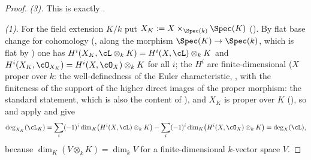 \begin{proof}
\emph{(3).}  This is exactly .

\emph{(1).}  For the field extension $K/k$ put $X_K:=X\times_{\Spec(k)}\Spec(K)$ ().
By flat base change for cohomology (,
along the morphism $\Spec(K)\to\Spec(k)$, which is flat by
) one has
$H^i(X_K,\cL\otimes_kK)=H^i(X,\cL)\otimes_kK$ and
$H^i(X_K,\cO_{X_K})=H^i(X,\cO_X)\otimes_kK$ for all $i$; the $H^i$ are
finite-dimensional ($X$ proper over $k$: the well-definedness of the
Euler characteristic, ,
with the finiteness of the support of the higher direct images of the
proper morphism: the standard statement, which is also the content of
), and $X_K$ is proper over $K$
(), so
 and 
apply and give
\[
\deg_{X_K}(\cL_K)
=\sum_i(-1)^i\dim_K\bigl(H^i(X,\cL)\otimes_kK\bigr)
-\sum_i(-1)^i\dim_K\bigl(H^i(X,\cO_X)\otimes_kK\bigr)
=\deg_X(\cL),
\]
because $\dim_K(V\otimes_kK)=\dim_kV$ for a finite-dimensional
$k$-vector space $V$.


\end{proof}
